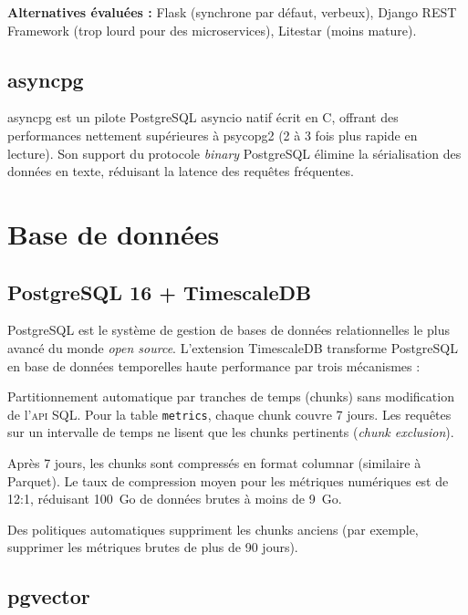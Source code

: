 \textbf{Alternatives évaluées :} Flask (synchrone par défaut, verbeux), Django
REST Framework (trop lourd pour des microservices), Litestar (moins mature).

\subsection{asyncpg}

asyncpg est un pilote PostgreSQL asyncio natif écrit en C, offrant des
performances nettement supérieures à psycopg2 (2 à 3 fois plus rapide en lecture).
Son support du protocole \textit{binary} PostgreSQL élimine la sérialisation
des données en texte, réduisant la latence des requêtes fréquentes.

\section{Base de données}

\subsection{PostgreSQL 16 + TimescaleDB}

PostgreSQL \cite{postgresql16_doc} est le système de gestion de bases de données
relationnelles le plus avancé du monde \textit{open source}. L'extension
TimescaleDB \cite{timescaledb2017} transforme PostgreSQL en base de données
temporelles haute performance par trois mécanismes :

\begin{description}[leftmargin=2cm, style=nextline]
  \item[Hypertables] Partitionnement automatique par tranches de temps
    (chunks) sans modification de l'\textsc{api} SQL. Pour la table \texttt{metrics},
    chaque chunk couvre 7 jours. Les requêtes sur un intervalle de temps ne
    lisent que les chunks pertinents (\textit{chunk exclusion}).
  \item[Compression columnar] Après 7 jours, les chunks sont compressés en format
    columnar (similaire à Parquet). Le taux de compression moyen pour les métriques
    numériques est de 12:1, réduisant 100~Go de données brutes à moins de 9~Go.
  \item[Politiques de rétention] Des politiques automatiques suppriment les
    chunks anciens (par exemple, supprimer les métriques brutes de plus de 90 jours).
\end{description}

\subsection{pgvector}

